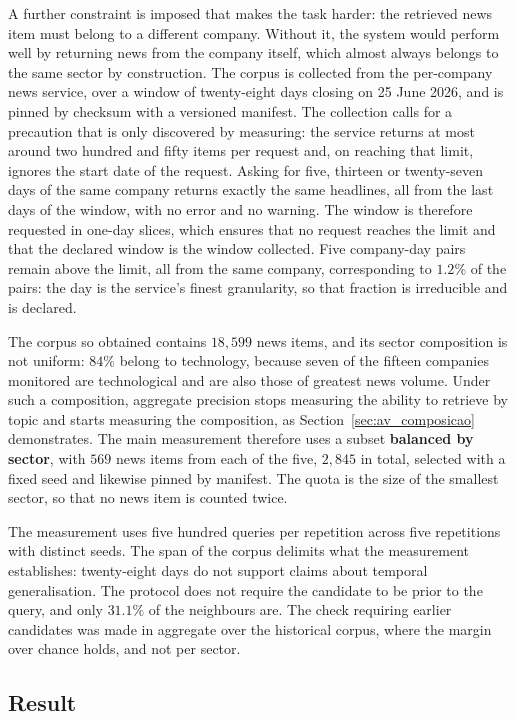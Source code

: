 A further constraint is imposed that makes the task harder: the retrieved news item must belong to
a different company. Without it, the system would perform well by returning news from the company
itself, which almost always belongs to the same sector by construction. The corpus is collected from the per-company news service, over a window of twenty-eight days
closing on 25 June 2026, and is pinned by checksum with a versioned manifest. The collection calls
for a precaution that is only discovered by measuring: the service returns at most around two
hundred and fifty items per request and, on reaching that limit, ignores the start date of the
request. Asking for five, thirteen or twenty-seven days of the same company returns exactly the
same headlines, all from the last days of the window, with no error and no warning. The window is
therefore requested in one-day slices, which ensures that no request reaches the limit and that
the declared window is the window collected. Five company-day pairs remain above the limit, all
from the same company, corresponding to $1.2\%$ of the pairs: the day is the service's finest
granularity, so that fraction is irreducible and is declared.

The corpus so obtained contains $18{,}599$ news items, and its sector composition is not uniform:
$84\%$ belong to technology, because seven of the fifteen companies monitored are technological and
are also those of greatest news volume. Under such a composition, aggregate precision stops
measuring the ability to retrieve by topic and starts measuring the composition, as
Section~\ref{sec:av_composicao} demonstrates. The main measurement therefore uses a subset
\textbf{balanced by sector}, with $569$ news items from each of the five, $2{,}845$ in total,
selected with a fixed seed and likewise pinned by manifest. The quota is the size of the smallest
sector, so that no news item is counted twice.

The measurement uses five hundred queries per repetition across five repetitions with distinct
seeds. The span of the corpus delimits what the measurement establishes: twenty-eight days do not
support claims about temporal generalisation. The protocol does not require the candidate to be prior to
the query, and only $31.1\%$ of the neighbours are. The check requiring earlier candidates was made
in aggregate over the historical corpus, where the margin over chance holds, and not per sector.

\subsection{Result}

